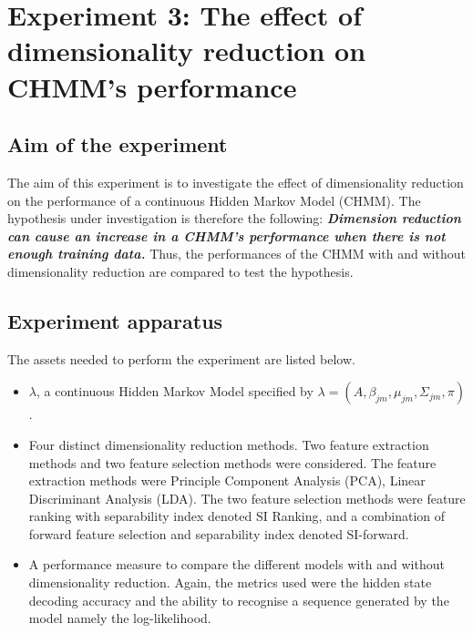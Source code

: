 \newpage
\section{Experiment 3: The effect of dimensionality reduction on CHMM's performance}  \label{exp:dim}

\subsection{Aim of the experiment}
The aim of this experiment is to investigate the effect of dimensionality reduction on the performance of a continuous Hidden Markov Model (CHMM).
The hypothesis under investigation is therefore the following:
\textbf{\textit{Dimension reduction can cause an increase in a CHMM's performance when there is not enough training data.}}
Thus, the performances of the CHMM with and without dimensionality reduction are compared to test the hypothesis.

\subsection{Experiment apparatus}
The assets needed to perform the experiment are listed below.
\begin{itemize}
	\item \(\lambda\), a continuous Hidden Markov Model specified by \(\lambda = (A, \beta_{jm}, \mu_{jm}, \Sigma_{jm}, \pi)\).
	\item Four distinct dimensionality reduction methods. Two feature extraction methods and two feature selection methods were considered. The feature extraction methods were Principle Component Analysis (PCA), Linear Discriminant Analysis (LDA). The two feature selection methods were feature ranking with separability index denoted SI Ranking, and a combination of forward feature selection and separability index denoted SI-forward.
	\item A performance measure to compare the different models with and without dimensionality reduction. Again, the metrics used were the hidden state decoding accuracy and the ability to recognise a sequence generated by the model namely the log-likelihood.
\end{itemize}

